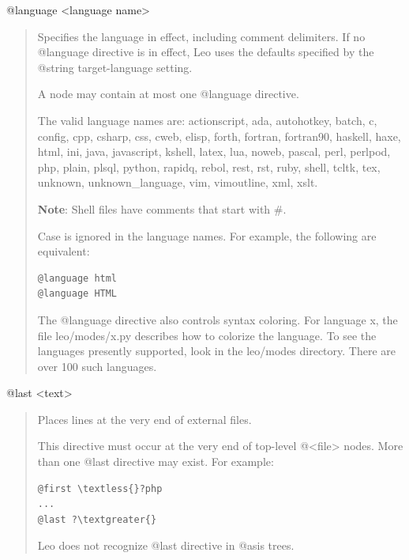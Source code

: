 \documentclass[a4paper,10pt,english]{sphinxmanual}
\begin{document}
@language \textless{}language name\textgreater{}
\begin{quote}

Specifies the language in effect, including comment delimiters.
If no @language directive is in effect, Leo uses the defaults specified
by the @string target-language setting.

A node may contain at most one @language directive.

The valid language names are: actionscript, ada, autohotkey, batch, c, config,
cpp, csharp, css, cweb, elisp, forth, fortran, fortran90, haskell, haxe,
html, ini, java, javascript, kshell, latex, lua, noweb, pascal, perl,
perlpod, php, plain, plsql, python, rapidq, rebol, rest, rst, ruby, shell,
tcltk, tex, unknown, unknown\_language, vim, vimoutline, xml, xslt.

\textbf{Note}: Shell files have comments that start with \#.

Case is ignored in the language names. For example, the following are
equivalent:

\begin{Verbatim}[commandchars=\\\{\}]
@language html
@language HTML
\end{Verbatim}

The @language directive also controls syntax coloring. For language x, the
file leo/modes/x.py describes how to colorize the language. To see the
languages presently supported, look in the leo/modes directory. There are
over 100 such languages.
\end{quote}

@last \textless{}text\textgreater{}
\begin{quote}

Places lines at the very end of external files.

This directive must occur at the very end of top-level @\textless{}file\textgreater{} nodes. More
than one @last directive may exist. For example:

\begin{Verbatim}[commandchars=\\\{\}]
@first \textless{}?php
...
@last ?\textgreater{}
\end{Verbatim}

Leo does not recognize @last directive in @asis trees.
\end{quote}
\end{document}

